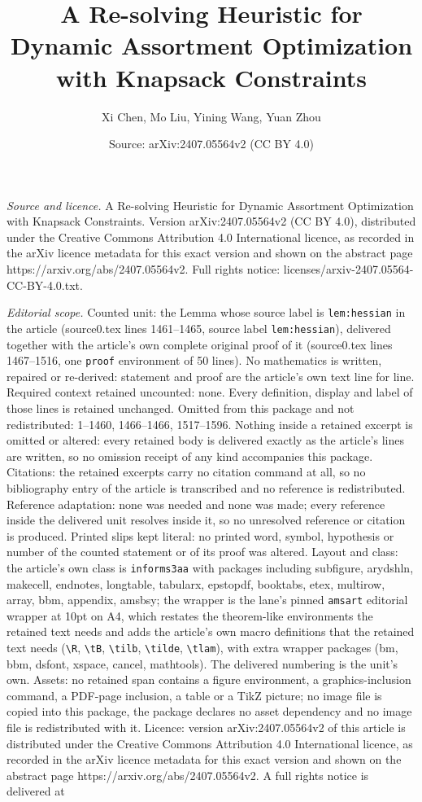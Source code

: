 \documentclass[10pt,a4paper]{amsart}
\title[A Re-solving Heuristic for Dynamic Assortment Optimization w]{A Re-solving Heuristic for Dynamic Assortment Optimization with Knapsack Constraints}
\author{Xi Chen, Mo Liu, Yining Wang, Yuan Zhou}
\date{Source: arXiv:2407.05564v2 (CC BY 4.0)}
\begin{document}
\maketitle

\noindent\emph{Source and licence.} A Re-solving Heuristic for Dynamic Assortment Optimization with Knapsack Constraints. Version arXiv:2407.05564v2 (CC BY 4.0), distributed under the Creative Commons Attribution 4.0 International licence, as recorded in the arXiv licence metadata for this exact version and shown on the abstract page https://arxiv.org/abs/2407.05564v2. Full rights notice: licenses/arxiv-2407.05564-CC-BY-4.0.txt.\par\smallskip

\noindent\textit{Editorial scope.} Counted unit: the Lemma whose source label is \texttt{lem:hessian} in the article (source0.tex lines 1461--1465, source label \texttt{lem:hessian}), delivered together with the article's own complete original proof of it (source0.tex lines 1467--1516, one \texttt{proof} environment of 50 lines). No mathematics is written, repaired or re-derived: statement and proof are the article's own text line for line. Required context retained uncounted: none. Every definition, display and label of those lines is retained unchanged. Omitted from this package and not redistributed: 1--1460, 1466--1466, 1517--1596. Nothing inside a retained excerpt is omitted or altered: every retained body is delivered exactly as the article's lines are written, so no omission receipt of any kind accompanies this package. Citations: the retained excerpts carry no citation command at all, so no bibliography entry of the article is transcribed and no reference is redistributed. Reference adaptation: none was needed and none was made; every reference inside the delivered unit resolves inside it, so no unresolved reference or citation is produced. Printed slips kept literal: no printed word, symbol, hypothesis or number of the counted statement or of its proof was altered. Layout and class: the article's own class is \texttt{informs3aa} with packages including subfigure, arydshln, makecell, endnotes, longtable, tabularx, epstopdf, booktabs, etex, multirow, array, bbm, appendix, amsbsy; the wrapper is the lane's pinned \texttt{amsart} editorial wrapper at 10pt on A4, which restates the theorem-like environments the retained text needs and adds the article's own macro definitions that the retained text needs (\texttt{\textbackslash R}, \texttt{\textbackslash tB}, \texttt{\textbackslash tilb}, \texttt{\textbackslash tilde}, \texttt{\textbackslash tlam}), with extra wrapper packages (bm, bbm, dsfont, xspace, cancel, mathtools). The delivered numbering is the unit's own. Assets: no retained span contains a figure environment, a graphics-inclusion command, a PDF-page inclusion, a table or a TikZ picture; no image file is copied into this package, the package declares no asset dependency and no image file is redistributed with it. Licence: version arXiv:2407.05564v2 of this article is distributed under the Creative Commons Attribution 4.0 International licence, as recorded in the arXiv licence metadata for this exact version and shown on the abstract page https://arxiv.org/abs/2407.05564v2. A full rights notice is delivered at 
\end{document}
